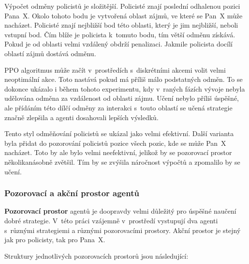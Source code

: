 Výpočet odměny policistů je složitější.
Policisté znají poslední odhalenou pozici Pana~X\@.
Okolo tohoto bodu je vytvořená oblast zájmů, ve které se Pan~X může nacházet.
Policisté znají nejbližší bod této oblasti, který je jim nejbližší, neboli vstupní bod.
Čím blíže je policista k~tomuto bodu, tím větší odměnu získává.
Pokud je od oblasti velmi vzdálený obdrží penalizaci.
Jakmile policista docílí oblastí zájmů dostává odměnu.

PPO algoritmus může začít v~prostředích s~diskrétními akcemi volit velmi neoptimální akce.
Toto nastává pokud má příliš málo podstatných odměn\cite{PPO_weakness}.
To se dokonce ukázalo i během tohoto experimentu, kdy v~raných fázích vývoje nebyla udělována odměna za vzdálenost od oblasti zájmu.
Učení nebylo příliš úspěšné, ale přídáním této dílčí odměny za interakci s~touto oblastí se učená strategie značně zlepšila a agenti dosahovali lepších výsledků.

Tento styl odměňování policistů se ukázal jako velmi efektivní.
Další varianta byla přidat do pozorování policistů pozice všech pozic, kde se může Pan~X nacházet.
Toto by ale bylo velmi neefektivní, jelikož by se pozorovací prostor několikanásobně zvětšil.
Tím by se zvýšila náročnost výpočtů a zpomalilo by se učení.
\subsubsection*{Pozorovací a akční prostor agentů}

\textbf{Pozorovací prostor} agentů je doopravdy velmi důležitý pro úspěšné naučení dobré strategie.
V~této práci vzájemně v~prostředí vystupují dva agenti s~různými strategiemi a různými pozorovacími prostory.
Akční prostor je stejný jak pro policisty, tak pro Pana~X\@.

Struktury jednotlivých pozorovacích prostorů jsou následující:

